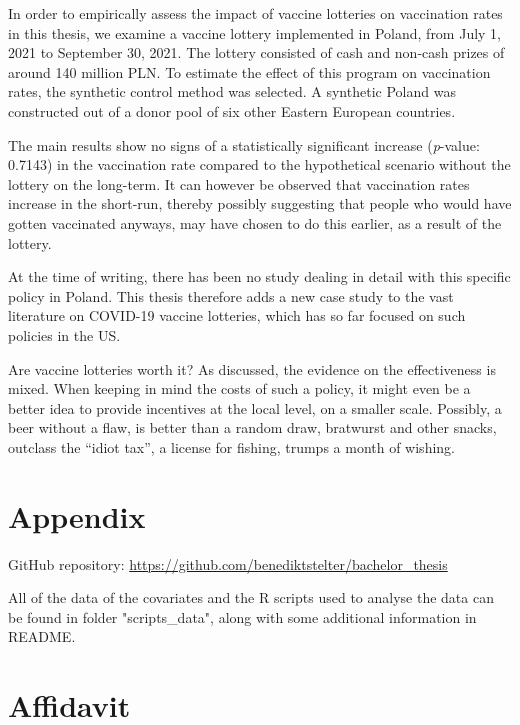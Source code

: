 \documentclass{scrbook}
\begin{document}
In order to empirically assess the impact of vaccine lotteries on
vaccination rates in this thesis, we examine a vaccine lottery
implemented in Poland, from July 1, 2021 to September 30, 2021. The
lottery consisted of cash and non-cash prizes of around 140 million PLN.
To estimate the effect of this program on vaccination rates, the
synthetic control method was selected. A synthetic Poland was
constructed out of a donor pool of six other Eastern European countries.

The main results show no signs of a statistically significant increase
(\textit{p}-value: 0.7143) in the vaccination rate compared to the
hypothetical scenario without the lottery on the long-term. It can
however be observed that vaccination rates increase in the short-run,
thereby possibly suggesting that people who would have gotten vaccinated
anyways, may have chosen to do this earlier, as a result of the lottery.

At the time of writing, there has been no study dealing in detail with
this specific policy in Poland. This thesis therefore adds a new case
study to the vast literature on COVID-19 vaccine lotteries, which has so
far focused on such policies in the US.

Are vaccine lotteries worth it? As discussed, the evidence on the
effectiveness is mixed. When keeping in mind the costs of such a policy,
it might even be a better idea to provide incentives at the local level,
on a smaller scale. Possibly, a beer without a flaw, is better than a
random draw, bratwurst and other snacks, outclass the ``idiot tax'', a
license for fishing, trumps a month of wishing.


 
\backmatter


 
\renewcommand\refname{References}
\printbibliography[title=References]

\chapter{Appendix}
GitHub repository: \url{https://github.com/benediktstelter/bachelor_thesis}

\noindent All of the data of the covariates and the R scripts used to analyse the data can be found in folder "scripts\_data", along with some additional information in README.



\chapter{Affidavit}
\thispagestyle{empty}
\end{document}
